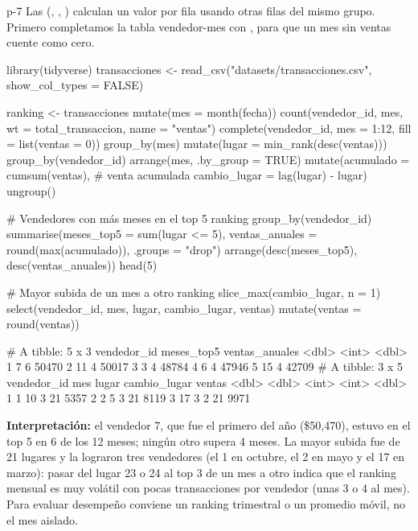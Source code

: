 \begin{solucion}{p-7}
Las  (, ,
) calculan un valor por fila usando otras filas del mismo
grupo. Primero completamos la tabla vendedor-mes con ,
para que un mes sin ventas cuente como cero.
\end{solucion}

\begin{rcode}
library(tidyverse)
transacciones <- read_csv("datasets/transacciones.csv",
                          show_col_types = FALSE)

ranking <- transacciones %
  mutate(mes = month(fecha)) %
  count(vendedor_id, mes, wt = total_transaccion, name = "ventas") %
  complete(vendedor_id, mes = 1:12, fill = list(ventas = 0)) %
  group_by(mes) %
  mutate(lugar = min_rank(desc(ventas))) %
  group_by(vendedor_id) %
  arrange(mes, .by_group = TRUE) %
  mutate(acumulado = cumsum(ventas),                  # venta acumulada
         cambio_lugar = lag(lugar) - lugar) %
  ungroup()

# Vendedores con más meses en el top 5
ranking %
  group_by(vendedor_id) %
  summarise(meses_top5 = sum(lugar <= 5),
            ventas_anuales = round(max(acumulado)), .groups = "drop") %
  arrange(desc(meses_top5), desc(ventas_anuales)) %
  head(5)

# Mayor subida de un mes a otro
ranking %
  slice_max(cambio_lugar, n = 1) %
  select(vendedor_id, mes, lugar, cambio_lugar, ventas) %
  mutate(ventas = round(ventas))
\end{rcode}

\begin{rsalida}
# A tibble: 5 x 3
  vendedor_id meses_top5 ventas_anuales
        <dbl>      <int>          <dbl>
1           7          6          50470
2          11          4          50017
3           3          4          48784
4           6          4          47946
5          15          4          42709
# A tibble: 3 x 5
  vendedor_id   mes lugar cambio_lugar ventas
        <dbl> <dbl> <int>        <int>  <dbl>
1           1    10     3           21   5357
2           2     5     3           21   8119
3          17     3     2           21   9971
\end{rsalida}

\textbf{Interpretación:} el vendedor 7, que fue el primero del año
(\$50,470), estuvo en el top 5 en 6 de los 12 meses; ningún otro supera 4
meses. La mayor subida fue de 21 lugares y la lograron tres vendedores (el 1
en octubre, el 2 en mayo y el 17 en marzo): pasar del lugar 23 o 24 al top 3
de un mes a otro indica que el ranking mensual es muy volátil con pocas
transacciones por vendedor (unas 3 o 4 al mes). Para evaluar desempeño
conviene un ranking trimestral o un promedio móvil, no el mes aislado.


